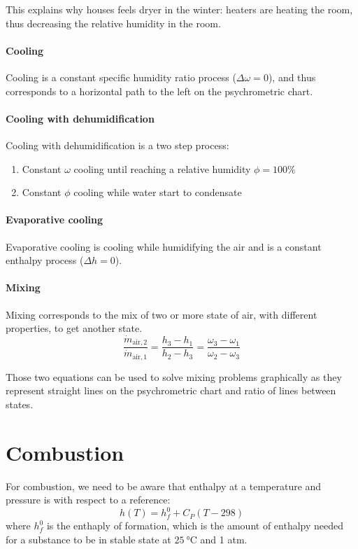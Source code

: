 \documentclass[10pt, twocolumn]{article}
\begin{document}
This explains why houses feels dryer in the winter: heaters are heating the room, thus decreasing the relative humidity in the room.

\paragraph{Cooling}
Cooling is a constant specific humidity ratio process (\(\Delta\omega = 0\)), and thus corresponds to a horizontal path to the left on the psychrometric chart.

\paragraph{Cooling with dehumidification}
Cooling with dehumidification is a two step process:
\begin{enumerate}
  \item Constant \(\omega\) cooling until reaching a relative humidity \(\phi = 100\%\)
  \item Constant \(\phi\) cooling while water start to condensate
\end{enumerate}

\paragraph{Evaporative cooling}
Evaporative cooling is cooling while humidifying the air and is a constant enthalpy process (\(\Delta h = 0\)).

\paragraph{Mixing}
Mixing corresponds to the mix of two or more state of air, with different properties, to get another state.
\[
  \frac{\dot{m}_{\mathrm{air},2}}{\dot{m}_{\mathrm{air},1}} = \frac{h_3 - h_1}{h_2 - h_3} = \frac{\omega_3 - \omega_1}{\omega_2 - \omega_3}
\]

Those two equations can be used to solve mixing problems graphically as they represent straight lines on the psychrometric chart and ratio of lines between states.


\section{Combustion}
For combustion, we need to be aware that enthalpy at a temperature and pressure is with respect to a reference:
\[
  h(T) = h^0_f + C_P(T - 298)
\]
where \(h^0_f\) is the enthaply of formation, which is the amount of enthalpy needed for a substance to be in stable state at \(\SI{25}{\celsius}\) and 1 atm.
\end{document}
